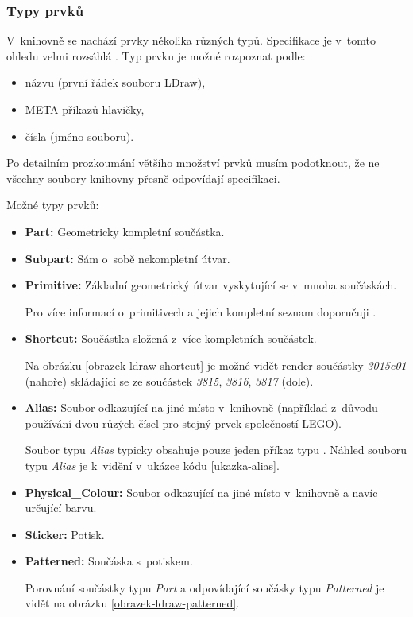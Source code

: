     \subsubsection*{Typy prvků}\label{ldraw-typy-soucastek}
    V~knihovně se nachází prvky několika různých typů. Specifikace je v~tomto ohledu velmi rozsáhlá \autocite{ldraw:header:specification}\autocite{ldraw:sticker:specification}. Typ prvku je možné rozpoznat podle: 
    \begin{itemize}
        \item názvu (první řádek souboru LDraw),
        \item META příkazů hlavičky,
        \item čísla (jméno souboru).
    \end{itemize}
    
    Po detailním prozkoumání většího množství prvků musím podotknout, že ne všechny soubory knihovny přesně odpovídají specifikaci. 

    Možné typy prvků:
    
    \begin{itemize}
        \item \textbf{Part:} Geometricky kompletní součástka.
        \item \textbf{Subpart:} Sám o~sobě nekompletní útvar.
        \item \textbf{Primitive:} Základní geometrický útvar vyskytující se v~mnoha součáskách.

        Pro více informací o~primitivech a jejich kompletní seznam doporučuji \autocite{ldraw:primitives}.

        \item \textbf{Shortcut:} Součástka složená z~více kompletních součástek.

        Na obrázku \ref{obrazek-ldraw-shortcut} je možné vidět render součástky \textit{3015c01} (nahoře) skládající se ze součástek \textit{3815}, \textit{3816}, \textit{3817} (dole).

        \item \textbf{Alias:} Soubor odkazující na jiné místo v~knihovně (například z~důvodu používání dvou růzých čísel pro stejný prvek společností LEGO). 
        
        Soubor typu \textit{Alias} typicky obsahuje pouze jeden příkaz typu . Náhled souboru typu \textit{Alias} je k~vidění v~ukázce kódu \ref{ukazka-alias}.

        \item \textbf{Physical\_Colour:} Soubor odkazující na jiné místo v~knihovně a navíc určující barvu.
        \item \textbf{Sticker:} Potisk.
        \item \textbf{Patterned:} Součáska s~potiskem.
        
        Porovnání součástky typu \textit{Part} a odpovídající součásky typu \textit{Patterned} je vidět na obrázku \ref{obrazek-ldraw-patterned}.
        
    \end{itemize}
   
